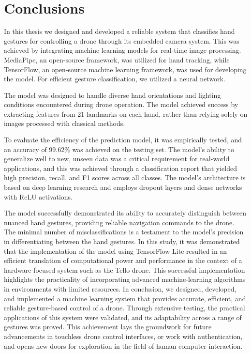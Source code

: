 \chapter{Conclusions}
In this thesis we designed and developed
 a reliable system that classifies hand gestures for controlling a drone through
 its embedded camera system.
  This was achieved by integrating machine learning models for real-time image processing. MediaPipe, an open-source framework, was utilized for hand tracking, while TensorFlow, an open-source machine learning framework, was used for developing the model. 
  For efficient gesture classification, we utilized a neural network.
  
   The model was designed to handle diverse hand orientations and lighting conditions encountered during drone operation. 
 The model achieved success by extracting features from 21 landmarks on each hand, rather than relying solely on images processed with classical methods. 

To evaluate the efficiency of the prediction model, it was empirically tested, and an accuracy of 99.62\% was achieved on the testing set. The model's ability to generalize well to new, unseen data was a critical requirement for real-world applications, and this was achieved through a classification report that yielded high precision, recall, and F1 scores across all classes. The model's architecture is based on deep learning research and employs dropout layers and dense networks with ReLU activations.

The model successfully demonstrated its ability to accurately distinguish between nuanced hand gestures, providing reliable navigation commands to the drone. The minimal number of misclassifications is a testament to the model's precision in differentiating between the hand gestures.
In this study, it was demonstrated that the implementation of the model using TensorFlow Lite resulted in an efficient translation of computational power and performance in the context of a hardware-focused system such as the Tello drone. This successful implementation highlights the practicality of incorporating advanced machine-learning algorithms in environments with limited resources. 
In conclusion, we designed, developed, and implemented a machine learning system that provides accurate, efficient, and reliable gesture-based control of a drone.
 Through extensive testing, the practical applications of this system were validated, and its adaptability across a range of gestures was proved. This achievement lays the groundwork for future advancements in touchless drone control interfaces, or work with authentication, and opens new doors for exploration in the field of human-computer interaction.
